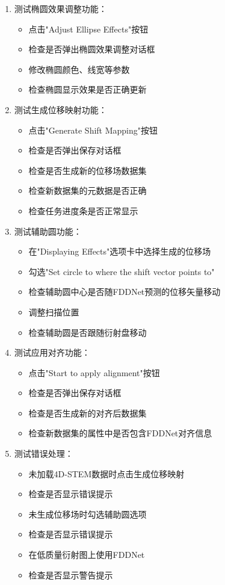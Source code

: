 \documentclass[a4paper,12pt]{report}	%
\begin{document}
\begin{enumerate}
    \item 测试椭圆效果调整功能：
    \begin{itemize}
        \item 点击"Adjust Ellipse Effects"按钮
        \item 检查是否弹出椭圆效果调整对话框
        \item 修改椭圆颜色、线宽等参数
        \item 检查椭圆显示效果是否正确更新
    \end{itemize}

    \item 测试生成位移映射功能：
    \begin{itemize}
        \item 点击"Generate Shift Mapping"按钮
        \item 检查是否弹出保存对话框
        \item 检查是否生成新的位移场数据集
        \item 检查新数据集的元数据是否正确
        \item 检查任务进度条是否正常显示
    \end{itemize}

    \item 测试辅助圆功能：
    \begin{itemize}
        \item 在"Displaying Effects"选项卡中选择生成的位移场
        \item 勾选"Set circle to where the shift vector points to"
        \item 检查辅助圆中心是否随FDDNet预测的位移矢量移动
        \item 调整扫描位置
        \item 检查辅助圆是否跟随衍射盘移动
    \end{itemize}

    \item 测试应用对齐功能：
    \begin{itemize}
        \item 点击"Start to apply alignment"按钮
        \item 检查是否弹出保存对话框
        \item 检查是否生成新的对齐后数据集
        \item 检查新数据集的属性中是否包含FDDNet对齐信息
    \end{itemize}

    \item 测试错误处理：
    \begin{itemize}
        \item 未加载4D-STEM数据时点击生成位移映射
        \item 检查是否显示错误提示
        \item 未生成位移场时勾选辅助圆选项
        \item 检查是否显示错误提示
        \item 在低质量衍射图上使用FDDNet
        \item 检查是否显示警告提示
    \end{itemize}
\end{enumerate}
\end{document}
